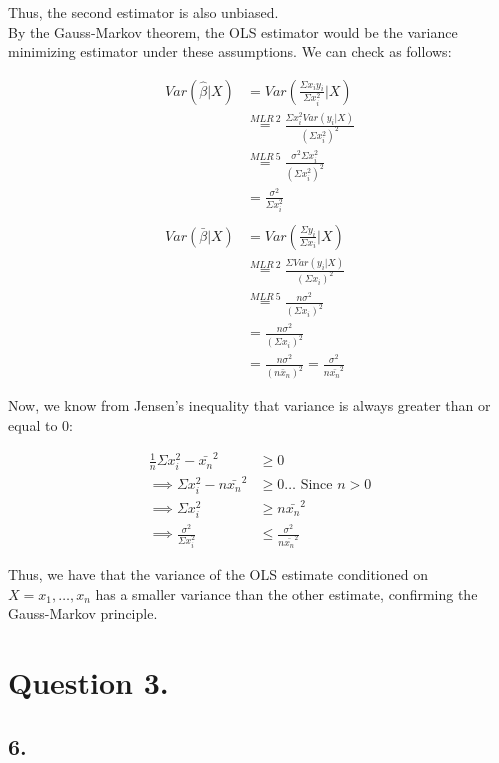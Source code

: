 \documentclass[
]{article}
\begin{document}
Thus, the second estimator is also unbiased.\\
By the Gauss-Markov theorem, the OLS estimator would be the variance
minimizing estimator under these assumptions. We can check as follows:

\[\begin{aligned}
Var(\hat\beta|X) &= Var(\frac{\Sigma x_iy_i}{\Sigma x_i^2}|X) \\
&\stackrel{MLR\:2}= \frac{\Sigma x_i^2Var(y_i|X)}{(\Sigma x_i^2)^2} \\
&\stackrel{MLR\:5}= \frac{\sigma^2 \Sigma x_i^2}{(\Sigma x_i^2)^2} \\
&= \frac{\sigma^2}{\Sigma x_i^2} \\
\\
Var(\bar\beta|X) &= Var(\frac{\Sigma y_i}{\Sigma x_i}|X) \\
&\stackrel{MLR\:2}= \frac{\Sigma Var(y_i|X)}{(\Sigma x_i)^2} \\
&\stackrel{MLR\:5}= \frac{n\sigma^2}{(\Sigma x_i)^2} \\
&= \frac{n\sigma^2}{(\Sigma x_i)^2} \\
&= \frac{n\sigma^2}{(n \bar x_n)^2} = \frac{\sigma^2}{n\bar{x_n}^2}
\end{aligned}\]

Now, we know from Jensen's inequality that variance is always greater
than or equal to 0:

\[\begin{aligned}
\frac{1}{n}\Sigma x_i^2 - \bar{x_n}^2 &\geq 0 \\
\implies \Sigma x_i^2 - n\bar{x_n}^2 &\geq 0 \dots  \text{ Since $n>0$} \\
\implies \Sigma x_i^2 &\geq n\bar{x_n}^2 \\
\implies \frac{\sigma^2}{\Sigma x_i^2} &\leq \frac{\sigma^2}{n\bar{x_n}^2}
\end{aligned}\]

Thus, we have that the variance of the OLS estimate conditioned on
\(X= x_1, \dots, x_n\) has a smaller variance than the other estimate,
confirming the Gauss-Markov principle.

\hypertarget{question-3.}{%
\section{Question 3.}\label{question-3.}}

\hypertarget{section}{%
\subsection{6.}\label{section}}
\end{document}
